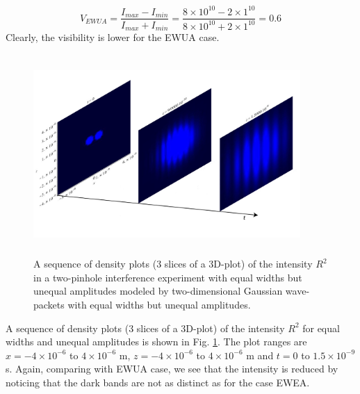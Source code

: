 \documentclass[12pt]{article}       %
\begin{document}
\[
V_{EWUA}=\frac{I_{max}-I_{min}}{I_{max}+I_{min}}=\frac{8\times 10^{10}-2\times 1^{10}}{8\times 10^{10}+2\times 1^{10}}=0.6
\]
Clearly, the visibility is lower for the EWUA case.


\begin{figure}[h]
\unitlength=1in 
\hspace*{1.0in}\includegraphics[width=4in,height=3in]  {figure12.jpg} 
\caption{A sequence of density plots (3 slices of a 3D-plot) of the intensity $R^2$  in a two-pinhole interference experiment with  equal widths but unequal amplitudes modeled by  two-dimensional Gaussian wave-packets with equal widths but unequal amplitudes.\label{INT2DGDPUA}}
\end{figure}
A sequence of density plots (3 slices of a 3D-plot) of the intensity $R^2$ for equal widths and unequal amplitudes is shown in  Fig. \ref{INT2DGDPUA}. The plot  ranges are $x=-4\times 10^{-6}$ to $4\times 10^{-6}$ m, $z=-4\times 10^{-6}$ to $4\times 10^{-6}$ m  and $t=0$ to $1.5\times 10^{-9}$ s. Again, comparing with EWUA case, we see that the intensity is reduced by noticing that the dark bands are not as distinct as for the case EWEA.
\end{document}
